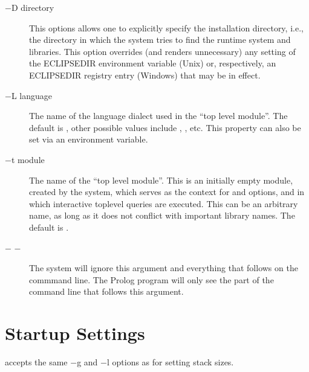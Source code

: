 \begin{description}
\item[$-$D directory]
This options allows one to explicitly specify the {\eclipse} installation
directory, i.e., the directory in which the system tries to find
the {\eclipse} runtime system and libraries.  This option overrides
(and renders unnecessary) any setting of the ECLIPSEDIR environment
variable (Unix) or, respectively, an ECLIPSEDIR registry entry
(Windows) that may be in effect.

\item[$-$L language]
The name of the language dialect used in the ``top level module''.
The default is , other possible values
include , ,  etc.
This property can also be set via an 
environment variable.

\item[$-$t module]
The name of the ``top level module''.  This is an initially empty module,
created by the system, which serves as the context for  and
 options, and in which interactive toplevel queries are executed.
This can be an arbitrary name, as long as it does not conflict with
important library names.  The default is .

\item[$-$ $-$]\cmdlineoptionidx{-}
The {\eclipse} system will ignore this argument and everything that follows on
the commmand line. The Prolog program will only see the part of the
command line that follows this argument.
\end{description}


\section{{\tkeclipse} Startup Settings}

 accepts the same $-$g and $-$l options as
 for setting stack sizes.

